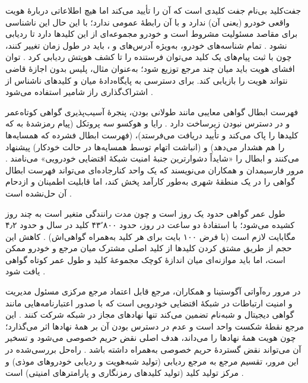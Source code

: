 \documentclass[12pt,a4paper]{article}
\begin{document}
جفت‌کلید بی‌نام جفت کلیدی است که  آن را تأیید می‌کند اما هیچ اطلاعاتی دربارهٔ هویت واقعی خودرو (یعنی  آن) ندارد و با آن رابطهٔ عمومی ندارد؛ با این حال این ناشناسی برای مقاصد مسئولیت مشروط است و خودرو مجموعه‌ای از این کلید‌ها دارد تا ردیابی نشود \cite{SecuringVehicularAd}. تمام شناسه‌های خودرو، به‌ویژه آدرس‌های  و ، باید در طول زمان تغییر کنند، چون با ثبت پیام‌های یک کلید می‌توان فرستنده را تا کشف هویتش ردیابی کرد \cite{SecuringVehicularAd}. توان افشای هویت باید میان چند مرجع توزیع شود؛ به‌عنوان مثال، پلیس بدون اجازهٔ قاضی نتواند هویت را بازیابی کند. برای دسترسی به پایگاه‌دادهٔ میان  و کلید‌های ناشناس از اشتراک‌گذاری راز شامیر استفاده می‌شود \cite{SecuringVehicularAd}.

فهرست ابطال گواهی معایبی مانند طولانی بودن، پنجرهٔ آسیب‌پذیری گواهی کوتاه‌عمر و در دسترس نبودن زیرساخت دارد \cite{SecuringVehicularAd}. رایا و هوکسو سه پروتکل  (پیام رمزشدهٔ  به  که کلید‌ها را پاک می‌کند و تأیید دریافت می‌فرستد)،  (فهرست ابطال فشرده که همسایه‌ها را هم هشدار می‌دهد) و  (انباشت اتهام توسط همسایه‌ها در حالت خودکار) پیشنهاد می‌کنند و ابطال را «شایداً دشوارترین جنبهٔ امنیت شبکهٔ اقتضایی خودرویی» می‌نامند \cite{SecuringVehicularAd}. مرور فارسیمدان و همکاران می‌نویسند که یک واحد کنارجاده‌ای می‌تواند فهرست ابطال گواهی را در یک منطقهٔ شهری به‌طور کارآمد پخش کند، اما قابلیت اطمینان و ازدحام آن حل‌نشده است \cite{farsimadanReviewSecurityChallenges2025}.

طول عمر گواهی حدود یک روز است و چون مدت رانندگی متغیر است به چند روز کشیده می‌شود؛ با استفادهٔ دو ساعت در روز، حدود ۴۳٬۸۰۰ کلید در سال و حدود ۴٫۲ مگابایت لازم است (با فرض ۱۰۰ بایت برای هر کلید به‌همراه گواهی‌اش) \cite{SecuringVehicularAd}. کاهش این حجم از طریق مشتق کردن کلید‌ها از کلید اصلی مشترک میان مرجع و خودرو ممکن است، اما باید موازنه‌ای میان اندازهٔ کوچک مجموعهٔ کلید و طول عمر کوتاه گواهی یافت شود \cite{SecuringVehicularAd}.

در مرور ره‌آواتی آگوستینا و همکاران، مرجع قابل اعتماد مرجع مرکزی مسئول مدیریت و امنیت ارتباطات در شبکهٔ اقتضایی خودرویی است که با صدور اعتبارنامه‌هایی مانند گواهی دیجیتال و شبه‌نام تضمین می‌کند تنها نهاد‌های مجاز در شبکه شرکت کنند \cite{rahmawatiagustinaSystematicLiteratureReview2025}. این مرجع نقطهٔ شکست واحد است و عدم در دسترس بودن آن بر همهٔ نهاد‌ها اثر می‌گذارد؛ چون هویت همهٔ نهاد‌ها را می‌داند، هدف اصلی نقض حریم خصوصی می‌شود و تسخیر آن می‌تواند نقض گستردهٔ حریم خصوصی به‌همراه داشته باشد \cite{rahmawatiagustinaSystematicLiteratureReview2025}. راه‌حل بررسی‌شده در این مرور، تقسیم مرجع به مرجع ردیابی (تولید شبه‌هویت و ردیابی خودرو‌های موذی) و مرکز تولید کلید (تولید کلید‌های رمزنگاری و پارامتر‌های امنیتی) است \cite{rahmawatiagustinaSystematicLiteratureReview2025}.
\end{document}
